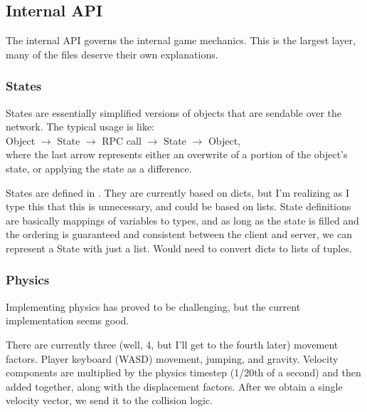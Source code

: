 \documentclass{article}
\begin{document}
\subsection{Internal API}
The internal API governs the internal game mechanics. This is the largest layer,
many of the files deserve their own explanations.

\subsubsection{States}
States are essentially simplified versions of objects that are sendable over
the network. The typical usage is like:\\
Object $\rightarrow$ State $\rightarrow$ RPC call $\rightarrow$ State
$\rightarrow$ Object,\\
where the last arrow represents either an overwrite of a portion of the object's state,
or applying the state as a difference.

States are defined in . They are currently based on dicts,
but I'm realizing as I type this that this is unnecessary, and could be based on
lists. State definitions are basically mappings of variables to types, and as long as
the state is filled and the ordering is guaranteed and consistent between the
client and server, we can represent a State with just a list. Would need to convert
dicts to lists of tuples.
\subsubsection{Physics}
Implementing physics has proved to be challenging, but the current implementation seems
good.

There are currently three (well, 4, but I'll get to the fourth later) movement
factors. Player keyboard (WASD) movement, jumping, and gravity. Velocity
components are multiplied by the physics timestep (1/20th of a second) and then
added together, along with the displacement factors. After we obtain a single
velocity vector, we send it to the collision logic.
\end{document}
